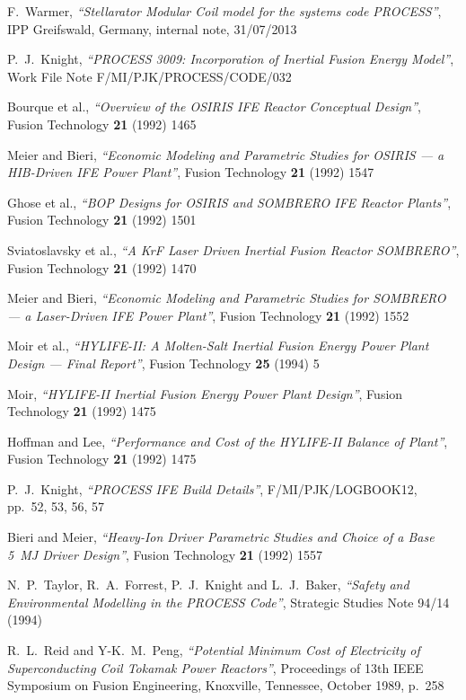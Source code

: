 \documentclass[11pt,a4paper]{report}
\begin{document}
\begin{thebibliography}{99}
F.\ Warmer,
\textit{``Stellarator Modular Coil model for the systems code PROCESS''},
IPP Greifswald, Germany, internal note, 31/07/2013

P.\ J.\ Knight,
\textit{``PROCESS 3009: Incorporation of Inertial Fusion Energy Model''},
Work File Note F/MI/PJK/PROCESS/CODE/032

Bourque et al.,
\textit{``Overview of the OSIRIS IFE Reactor Conceptual Design''},
Fusion Technology \textbf{21} (1992) 1465

Meier and Bieri,
\textit{``Economic Modeling and Parametric Studies for OSIRIS --- a HIB-Driven
  IFE Power Plant''},
Fusion Technology \textbf{21} (1992) 1547

Ghose et al.,
\textit{``BOP Designs for OSIRIS and SOMBRERO IFE Reactor Plants''},
Fusion Technology \textbf{21} (1992) 1501

Sviatoslavsky et al.,
\textit{``A KrF Laser Driven Inertial Fusion Reactor SOMBRERO''},
Fusion Technology \textbf{21} (1992) 1470

Meier and Bieri,
\textit{``Economic Modeling and Parametric Studies for SOMBRERO --- a Laser-Driven
  IFE Power Plant''},
Fusion Technology \textbf{21} (1992) 1552

Moir et al.,
\textit{``HYLIFE-II: A Molten-Salt Inertial Fusion Energy Power Plant Design
  --- Final Report''},
Fusion Technology \textbf{25} (1994) 5

Moir,
\textit{``HYLIFE-II Inertial Fusion Energy Power Plant Design''},
Fusion Technology \textbf{21} (1992) 1475

Hoffman and Lee,
\textit{``Performance and Cost of the HYLIFE-II Balance of Plant''},
Fusion Technology \textbf{21} (1992) 1475

P.\ J.\ Knight,
\textit{``PROCESS IFE Build Details''},
F/MI/PJK/LOGBOOK12, pp.\ 52, 53, 56, 57

Bieri and Meier,
\textit{``Heavy-Ion Driver Parametric Studies and Choice of a Base 5~MJ Driver
  Design''},
Fusion Technology \textbf{21} (1992) 1557

N.\ P.\ Taylor, R.\ A.\ Forrest, P.\ J.\ Knight and L.\ J.\ Baker,
\textit{``Safety and Environmental Modelling in the PROCESS Code''},
Strategic Studies Note 94/14 (1994)

R.\ L.\ Reid and Y-K.\ M.\ Peng,
\textit{``Potential Minimum Cost of Electricity of Superconducting Coil
Tokamak Power Reactors''},
Proceedings of 13th IEEE Symposium on Fusion Engineering, Knoxville,
Tennessee, October 1989, p.\ 258


\end{thebibliography}
\end{document}
